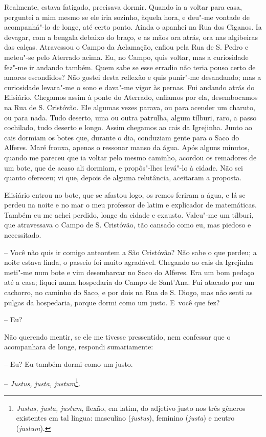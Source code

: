 Realmente, estava fatigado, precisava dormir. Quando ia a voltar para
casa, perguntei a mim mesmo se ele iria sozinho, àquela hora, e deu"-me
vontade de acompanhá"-lo de longe, até certo ponto. Ainda o apanhei na
Rua dos Ciganos. Ia devagar, com a bengala debaixo do braço, e as mãos
ora atrás, ora nas algibeiras das calças. Atravessou o Campo da
Aclamação, enfiou pela Rua de S. Pedro e meteu"-se pelo Aterrado acima.
Eu, no Campo, quis voltar, mas a curiosidade fez"-me ir andando também.
Quem sabe se esse erradio não teria pouso certo de amores escondidos?
Não gostei desta reflexão e quis punir"-me desandando; mas a curiosidade
levara"-me o sono e dava"-me vigor às pernas. Fui andando atrás do
Elisiário. Chegamos assim à ponte do Aterrado, enfiamos por ela,
desembocamos na Rua de S. Cristóvão. Ele algumas vezes parava, ou para
acender um charuto, ou para nada. Tudo deserto, uma ou outra patrulha,
algum tílburi, raro, a passo cochilado, tudo deserto e longo. Assim
chegamos ao cais da Igrejinha. Junto ao cais dormiam os botes que,
durante o dia, conduziam gente para o Saco do Alferes. Maré frouxa,
apenas o ressonar manso da água. Após alguns minutos, quando me pareceu
que ia voltar pelo mesmo caminho, acordou os remadores de um bote, que
de acaso ali dormiam, e propôs"-lhes levá"-lo à cidade. Não sei quanto
ofereceu; vi que, depois de alguma relutância, aceitaram a proposta.

Elisiário entrou no bote, que se afastou logo, os remos feriram a água,
e lá se perdeu na noite e no mar o meu professor de latim e explicador
de matemáticas. Também eu me achei perdido, longe da cidade e exausto.
Valeu"-me um tílburi, que atravessava o Campo de S. Cristóvão, tão
cansado como eu, mas piedoso e necessitado.

-- Você não quis ir comigo anteontem a São Cristóvão? Não sabe o que
perdeu; a noite estava linda, o passeio foi muito agradável. Chegando ao
cais da Igrejinha meti"-me num bote e vim desembarcar no Saco do Alferes.
Era um bom pedaço até a casa; fiquei numa hospedaria do Campo de
Sant'Ana. Fui atacado por um cachorro, no caminho do Saco, e por dois na
Rua de S. Diogo, mas não senti as pulgas da hospedaria, porque dormi
como um justo. E~você que fez?

-- Eu?

Não querendo mentir, se ele me tivesse pressentido, nem confessar que o
acompanhara de longe, respondi sumariamente:

-- Eu? Eu também dormi como um justo.

-- \emph{Justus, justa, justum}\footnote{\emph{Justus, justa, justum},
  flexão, em latim, do adjetivo justo nos três gêneros existentes em tal língua: masculino
  (\emph{justus}), feminino (\emph{justa}) e neutro (\emph{justum}).}.

